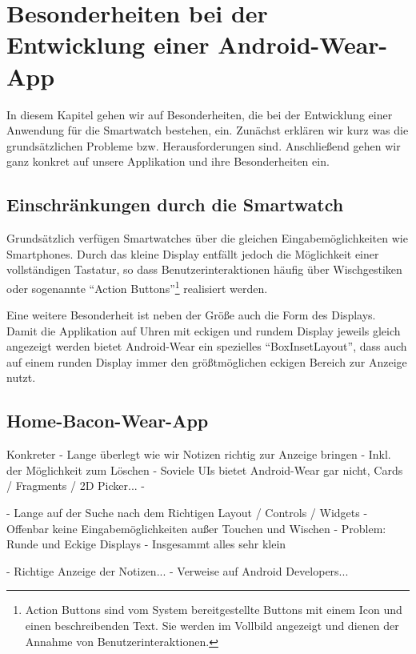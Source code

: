 \section{Besonderheiten bei der Entwicklung einer Android-Wear-App}
In diesem Kapitel gehen wir auf Besonderheiten, die bei der Entwicklung einer Anwendung für die Smartwatch bestehen, ein. Zunächst erklären wir kurz was die grundsätzlichen Probleme bzw. Herausforderungen sind. Anschließend gehen wir ganz konkret auf unsere Applikation und ihre Besonderheiten ein.

\subsection{Einschränkungen durch die Smartwatch}
Grundsätzlich verfügen Smartwatches über die gleichen Eingabemöglichkeiten wie Smartphones. Durch das kleine Display entfällt jedoch die Möglichkeit einer vollständigen Tastatur, so dass Benutzerinteraktionen häufig über Wischgestiken oder sogenannte "`Action Buttons"'\footnote{Action Buttons sind vom System bereitgestellte Buttons mit einem Icon und einen beschreibenden Text. Sie werden im Vollbild angezeigt und dienen der Annahme von Benutzerinteraktionen.} realisiert werden. 

Eine weitere Besonderheit ist neben der Größe auch die Form des Displays. Damit die Applikation auf Uhren mit eckigen und rundem Display jeweils gleich angezeigt werden bietet Android-Wear ein spezielles "`BoxInsetLayout"', dass auch auf einem runden Display immer den größtmöglichen eckigen Bereich zur Anzeige nutzt.

\subsection{Home-Bacon-Wear-App}


Konkreter
	- Lange überlegt wie wir Notizen richtig zur Anzeige bringen
		- Inkl. der Möglichkeit zum Löschen
	- Soviele UIs bietet Android-Wear gar nicht, Cards / Fragments / 2D Picker...
	- 

- Lange auf der Suche nach dem Richtigen Layout / Controls / Widgets
- Offenbar keine Eingabemöglichkeiten außer Touchen und Wischen
- Problem: Runde und Eckige Displays
- Insgesammt alles sehr klein

- Richtige Anzeige der Notizen...
- Verweise auf Android Developers...